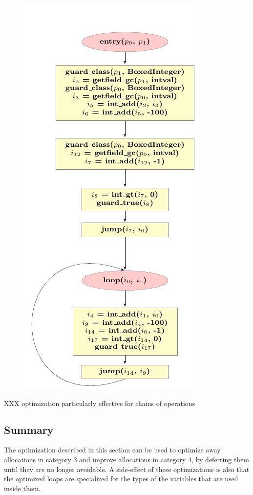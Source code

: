 \documentclass{sigplanconf}
\begin{document}
\begin{figure}
\includegraphics{figures/step4.pdf}
\end{figure}

XXX optimization particularly effective for chains of operations


\subsection{Summary}

The optimization described in this section can be used to optimize away
allocations in category 3 and improve allocations in category 4, by deferring
them until they are no longer avoidable. A side-effect of these optimizations
is also that the optimized loops are specialized for the types of the variables
that are used inside them.
\end{document}
